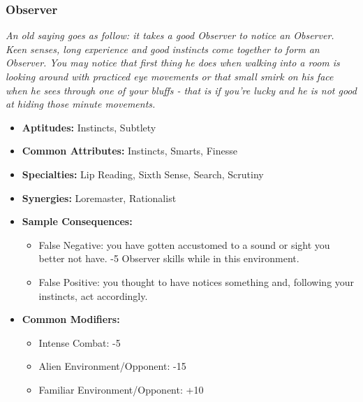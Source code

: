  \subsubsection{Observer}\label{Observer}
 \textit{An old saying goes as follow: it takes a good Observer to notice an Observer.
Keen senses, long experience and good instincts come together to form an Observer.
You may notice that first thing he does when walking into a room is looking around with practiced eye movements or that small smirk on his face when he sees through one of your bluffs - that is if you're lucky and he is not good at hiding those minute movements.}
 \begin{itemize}
 	\item \textbf{Aptitudes:} Instincts, Subtlety
 	\item \textbf{Common Attributes:} Instincts, Smarts, Finesse
 	\item \textbf{Specialties:} Lip Reading, Sixth Sense, Search, Scrutiny
 	\item \textbf{Synergies:} Loremaster, Rationalist
 	\item \textbf{Sample Consequences:} 
 	\begin{itemize}
 		\item False Negative: you have gotten accustomed to a sound or sight you better not have. -5 Observer skills while in this environment.
 		\item False Positive: you thought to have notices something and, following your instincts, act accordingly.
 	\end{itemize}
 	\item \textbf{Common Modifiers:}
 	\begin{itemize}
 		\item Intense Combat: -5
 		\item Alien Environment/Opponent: -15
 		\item Familiar Environment/Opponent: +10
 	\end{itemize}
 \end{itemize}


